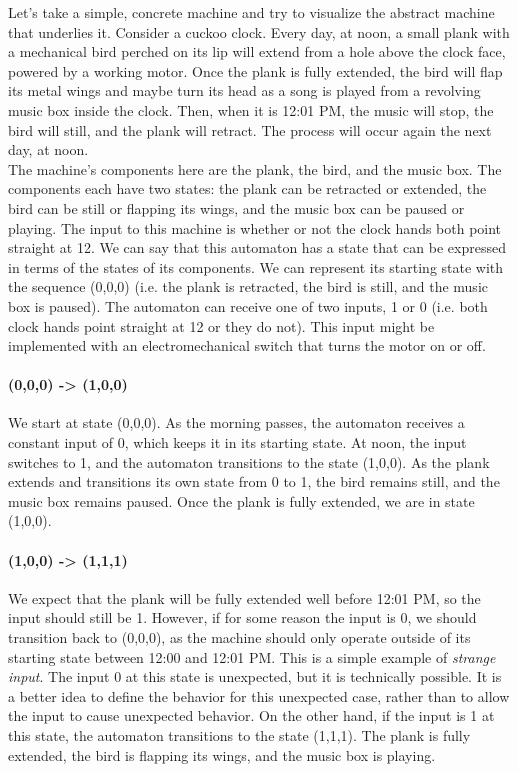 Let's take a simple, concrete machine and try to visualize the abstract machine that underlies it. Consider a cuckoo clock. Every day, at noon, a small plank with a mechanical bird perched on its lip will extend from a hole above the clock face, powered by a working motor. Once the plank is fully extended, the bird will flap its metal wings and maybe turn its head as a song is played from a revolving music box inside the clock. Then, when it is 12:01 PM, the music will stop, the bird will still, and the plank will retract. The process will occur again the next day, at noon. \\

The machine's components here are the plank, the bird, and the music box. The components each have two states: the plank can be retracted or extended, the bird can be still or flapping its wings, and the music box can be paused or playing. The input to this machine is whether or not the clock hands both point straight at 12. We can say that this automaton has a state that can be expressed in terms of the states of its components. We can represent its starting state with the sequence (0,0,0) (i.e. the plank is retracted, the bird is still, and the music box is paused). The automaton can receive one of two inputs, 1 or 0 (i.e. both clock hands point straight at 12 or they do not). This input might be implemented with an electromechanical switch that turns the motor on or off.

\paragraph{(0,0,0) -> (1,0,0)} We start at state (0,0,0). As the morning passes, the automaton receives a constant input of 0, which keeps it in its starting state. At noon, the input switches to 1, and the automaton transitions to the state (1,0,0). As the plank extends and transitions its own state from 0 to 1, the bird remains still, and the music box remains paused. Once the plank is fully extended, we are in state (1,0,0).

\paragraph{(1,0,0) -> (1,1,1)} We expect that the plank will be fully extended well before 12:01 PM, so the input should still be 1. However, if for some reason the input is 0, we should transition back to (0,0,0), as the machine should only operate outside of its starting state between 12:00 and 12:01 PM. This is a simple example of \textit{strange input}. The input 0 at this state is unexpected, but it is technically possible. It is a better idea to define the behavior for this unexpected case, rather than to allow the input to cause unexpected behavior. On the other hand, if the input is 1 at this state, the automaton transitions to the state (1,1,1). The plank is fully extended, the bird is flapping its wings, and the music box is playing.

